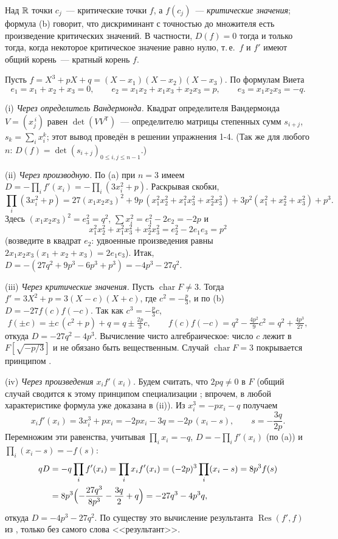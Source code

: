 Над $\mathbb R$ точки $c_j$~--- критические точки $f$, а $f(c_j)$~--- \emph{критические значения}; формула (b) говорит, что
дискриминант с точностью до множителя есть произведение критических значений. В частности, $D(f)=0$ тогда и только
тогда, когда некоторое критическое значение равно нулю, т.\,е.\ $f$ и $f'$ имеют общий корень~--- кратный корень $f$.

\begin{example}[4.2e: пять выводов формулы $D(X^3+pX+q)=-4p^3-27q^2$]
Пусть $f=X^3+pX+q=(X-x_1)(X-x_2)(X-x_3)$. По формулам Виета
\[
e_1=x_1+x_2+x_3=0,\qquad e_2=x_1x_2+x_1x_3+x_2x_3=p,\qquad e_3=x_1x_2x_3=-q .
\]

(i) \emph{Через определитель Вандермонда.} Квадрат определителя Вандермонда $V=(x_j^{\,i})$ равен
$\det(VV^{\mathsf T})$~--- определителю матрицы степенных сумм $s_{i+j}$, $s_k=\sum_ix_i^k$; этот вывод проведён в решении
упражнения 1-4. (Так же для любого $n$: $D(f)=\det(s_{i+j})_{0\le i,j\le n-1}$.)

(ii) \emph{Через производную.} По (a) при $n=3$ имеем $D=-\prod_i f'(x_i)=-\prod_i(3x_i^2+p)$. Раскрывая скобки,
\[
\prod_i(3x_i^2+p)=27(x_1x_2x_3)^2+9p\,(x_1^2x_2^2+x_1^2x_3^2+x_2^2x_3^2)+3p^2(x_1^2+x_2^2+x_3^2)+p^3 .
\]
Здесь $(x_1x_2x_3)^2=e_3^2=q^2$, $\sum x_i^2=e_1^2-2e_2=-2p$ и
\[
x_1^2x_2^2+x_1^2x_3^2+x_2^2x_3^2=e_2^2-2e_1e_3=p^2
\]
(возведите в квадрат $e_2$: удвоенные произведения равны $2x_1x_2x_3(x_1+x_2+x_3)=2e_1e_3$). Итак,
$D=-(27q^2+9p^3-6p^3+p^3)=-4p^3-27q^2$.

(iii) \emph{Через критические значения.} Пусть $\operatorname{char}F\ne3$. Тогда $f'=3X^2+p=3(X-c)(X+c)$, где $c^2=-\frac p3$, и
по (b) $D=-27f(c)f(-c)$. Так как $c^3=-\frac p3c$,
\[
f(\pm c)=\pm c\,(c^2+p)+q=q\pm\tfrac{2p}3c,\qquad f(c)f(-c)=q^2-\tfrac{4p^2}9c^2=q^2+\tfrac{4p^3}{27},
\]
откуда $D=-27q^2-4p^3$. Вычисление чисто алгебраическое: число $c$ лежит в $F[\sqrt{-p/3}]$ и не обязано быть
вещественным. Случай $\operatorname{char}F=3$ покрывается принципом .

(iv) \emph{Через произведения $x_if'(x_i)$.} Будем считать, что $2pq\ne0$ в $F$ (общий случай сводится к этому
принципом специализации ; впрочем, в любой характеристике формула уже доказана в (ii)). Из $x_i^3=-px_i-q$
получаем
\[
x_if'(x_i)=3x_i^3+px_i=-2px_i-3q=-2p\,(x_i-s),\qquad s=-\frac{3q}{2p}.
\]
Перемножим эти равенства, учитывая $\prod_ix_i=-q$, $D=-\prod_if'(x_i)$ (по (a)) и $\prod_i(x_i-s)=-f(s)$:
\begin{align*}
qD&=-q\prod_if'(x_i)=\prod_ix_if'(x_i)=(-2p)^3\prod_i(x_i-s)=8p^3f(s)\\
&=8p^3\Bigl(-\frac{27q^3}{8p^3}-\frac{3q}2+q\Bigr)=-27q^3-4p^3q,
\end{align*}
откуда $D=-4p^3-27q^2$. По существу это вычисление результанта $\operatorname{Res}(f',f)$ из , только без
самого слова <<результант>>.


\end{example}
